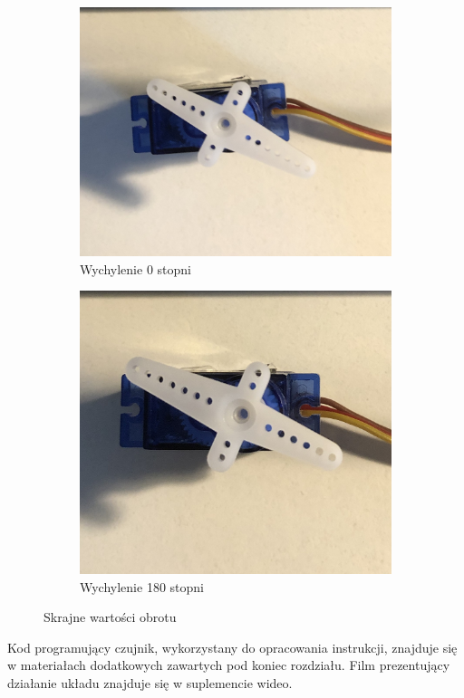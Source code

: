 \documentclass[11pt, a4paper]{article}
\begin{document}
\begin{figure}[h!]
\centering
\begin{subfigure}{.5\textwidth}
  \centering
  \includegraphics[width=0.9\linewidth]{fig/KY-018/zasada_dzialania/0.jpg}
  \caption{Wychylenie 0 stopni}
  \label{fig:sub1}
\end{subfigure}%
\begin{subfigure}{.5\textwidth}
  \centering
  \includegraphics[width=0.78\linewidth]{fig/KY-018/zasada_dzialania/180.jpg}
  \caption{Wychylenie 180 stopni}
  \label{fig:sub2}
\end{subfigure}
\caption{Skrajne wartości obrotu}
\label{fig:test}
\end{figure}
\newpage


Kod programujący czujnik, wykorzystany do opracowania instrukcji, znajduje się w materiałach dodatkowych zawartych pod koniec rozdziału.
\newline
Film prezentujący działanie układu znajduje się w suplemencie wideo.
\printbibliography[heading=bibintoc]
\end{document}
